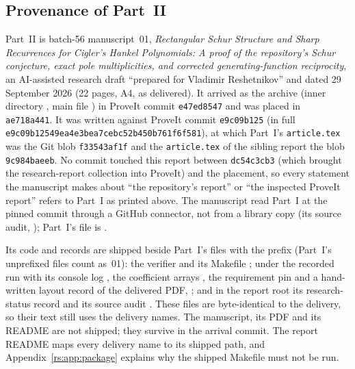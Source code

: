 \documentclass[11pt]{article}
\theoremstyle{definition}
\theoremstyle{remark}
\newcommand{\pin}{e9c09b12549ea4e3bea7cebc52b450b761f6f581}
\theoremstyle{definition}
\theoremstyle{plain}
\numberwithin{equation}{section}
\begin{document}
\subsection{Provenance of Part~II}
\label{rs:sec:merge-provenance}
Part~II is batch-56 manuscript~01, \emph{Rectangular Schur Structure and
Sharp Recurrences for Cigler's Hankel Polynomials: A proof of the
repository's Schur conjecture, exact pole multiplicities, and corrected
generating-function reciprocity}, an AI-assisted research draft ``prepared
for Vladimir Reshetnikov'' and dated 29 September 2026 (22 pages, A4, as
delivered). It arrived as the archive
 (inner directory
, main file ) in ProveIt
commit \texttt{e47ed8547} and was placed in \texttt{ae718a441}. It was
written against ProveIt commit \texttt{e9c09b125} (in full
\texttt{\pin}), at which Part~I's \texttt{article.tex} was the Git blob
\texttt{f33543af1f} and the \texttt{article.tex} of the sibling report
 \cite{RepoEight} the blob
\texttt{9c984baeeb}. No commit touched this report between \texttt{dc54c3cb3}
(which brought the research-report collection into ProveIt) and the
placement, so every statement the manuscript makes about ``the repository's
report'' or ``the inspected ProveIt report'' refers to Part~I as printed
above. The manuscript read Part~I at the pinned commit through a GitHub
connector, not from a library copy (its source audit,
); Part~I's file is
.

Its code and records are shipped beside Part~I's files with the prefix
 (Part~I's unprefixed files count as~01): the
verifier  and its Makefile
; under  the recorded
run  with its console log
, the coefficient arrays
, the requirement pin
 and a hand-written layout
record of the delivered PDF, ;
and in the report root its research-status record
 and its source audit
. These files are byte-identical to
the delivery, so their text still uses the delivery names. The manuscript,
its PDF and its README are not shipped; they survive in the arrival commit.
The report README maps every delivery name to its shipped path, and
Appendix~\ref{rs:app:package} explains why the shipped Makefile must not be
run.
\end{document}
